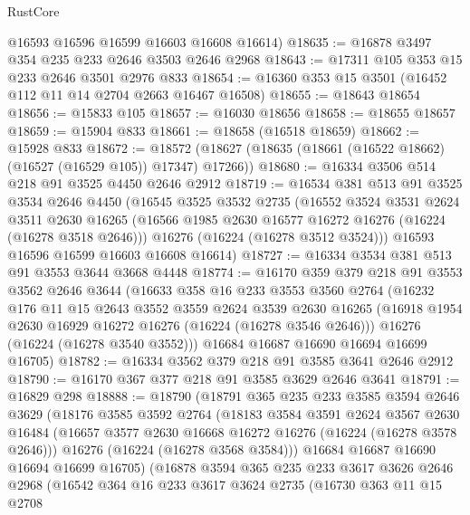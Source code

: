 \begin{lexlean}{RustCore}
\begin{coremodule}
      @16593
      @16596
      @16599
      @16603
      @16608
      @16614)
@18635 := @16878 @3497 @354 @235 @233 @2646 @3503 @2646 @2968
@18643 := @17311 @105 @353 @15 @233 @2646 @3501 @2976 @833
@18654 := @16360 @353 @15 @3501 (@16452 @112 @11 @14 @2704 @2663 @16467 @16508)
@18655 := @18643 @18654
@18656 := @15833 @105
@18657 := @16030 @18656
@18658 := @18655 @18657
@18659 := @15904 @833
@18661 := @18658 (@16518 @18659)
@18662 := @15928 @833
@18672 := @18572 (@18627 (@18635 (@18661 (@16522 @18662) (@16527 (@16529 @105)) @17347) @17266))
@18680 := @16334 @3506 @514 @218 @91 @3525 @4450 @2646 @2912
@18719 := @16534
    @381
    @513
    @91
    @3525
    @3534
    @2646
    @4450
    (@16545
      @3525
      @3532
      @2735
      (@16552
        @3524
        @3531
        @2624
        @3511
        @2630
        @16265
        (@16566 @1985 @2630 @16577 @16272 @16276 (@16224 (@16278 @3518 @2646)))
        @16276
        (@16224 (@16278 @3512 @3524)))
      @16593
      @16596
      @16599
      @16603
      @16608
      @16614)
@18727 := @16334 @3534 @381 @513 @91 @3553 @3644 @3668 @4448
@18774 := @16170
    @359
    @379
    @218
    @91
    @3553
    @3562
    @2646
    @3644
    (@16633
      @358
      @16
      @233
      @3553
      @3560
      @2764
      (@16232
        @176
        @11
        @15
        @2643
        @3552
        @3559
        @2624
        @3539
        @2630
        @16265
        (@16918 @1954 @2630 @16929 @16272 @16276 (@16224 (@16278 @3546 @2646)))
        @16276
        (@16224 (@16278 @3540 @3552)))
      @16684
      @16687
      @16690
      @16694
      @16699
      @16705)
@18782 := @16334 @3562 @379 @218 @91 @3585 @3641 @2646 @2912
@18790 := @16170 @367 @377 @218 @91 @3585 @3629 @2646 @3641
@18791 := @16829 @298
@18888 := @18790
    (@18791
      @365
      @235
      @233
      @3585
      @3594
      @2646
      @3629
      (@18176
        @3585
        @3592
        @2764
        (@18183
          @3584
          @3591
          @2624
          @3567
          @2630
          @16484
          (@16657 @3577 @2630 @16668 @16272 @16276 (@16224 (@16278 @3578 @2646)))
          @16276
          (@16224 (@16278 @3568 @3584)))
        @16684
        @16687
        @16690
        @16694
        @16699
        @16705)
      (@16878
        @3594
        @365
        @235
        @233
        @3617
        @3626
        @2646
        @2968
        (@16542
          @364
          @16
          @233
          @3617
          @3624
          @2735
          (@16730
            @363
            @11
            @15
            @2708

\end{coremodule}
\end{lexlean}
